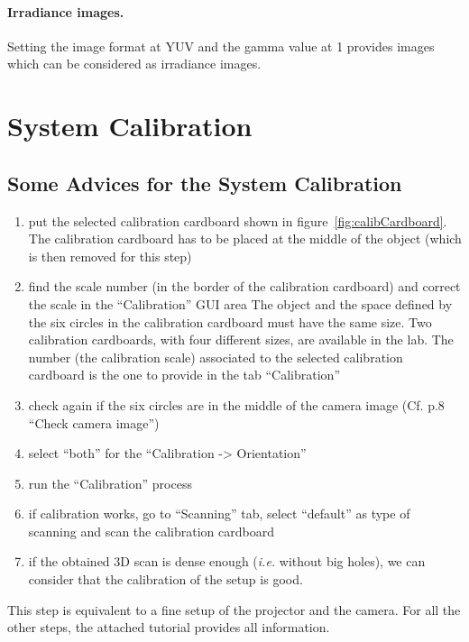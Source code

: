 \documentclass[11pt]{article}
\begin{document}
\begin{enumerate}
\paragraph{Irradiance images.} Setting the image format at YUV and the gamma value at 1 provides images which can be considered as irradiance images.
\end{enumerate}

\section{System Calibration}
\label{sec:systemCalib}
\subsection{Some Advices for the System Calibration}
\begin{enumerate}
\item put the selected calibration cardboard shown in figure~\ref{fig:calibCardboard}.
The calibration cardboard has to be placed at the middle of the object (which is then removed for this step)
\item find the scale number (in the border of the calibration cardboard) and correct the scale in the ``Calibration'' GUI area
The object and the space defined by the six circles in the calibration cardboard must have the same size.
Two calibration cardboards, with four different sizes, are available in the lab.
The number (the calibration scale) associated to the selected calibration cardboard is the one to provide in the tab ``Calibration''
\item check again if the six circles are in the middle of the camera image (Cf. p.8 ``Check camera image'')
\item select ``both'' for the ``Calibration -> Orientation''
\item run the ``Calibration'' process
\item if calibration works, go to ``Scanning'' tab, select ``default'' as type of scanning and scan the calibration cardboard
\item if the obtained 3D scan is dense enough (\textit{i.e.} without big holes), we can consider that the calibration of the setup is good.
\end{enumerate}

This step is equivalent to a fine setup of the projector and the camera.
For all the other steps, the attached tutorial provides all information.
\end{document}

